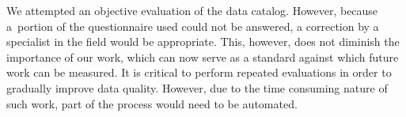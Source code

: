 We attempted an objective evaluation of the data catalog.
However, because a~portion of the questionnaire used could not be answered, a correction by a specialist in the field would be appropriate.
This, however, does not diminish the importance of our work, which can now serve as a standard against which future work can be measured.
It is critical to perform repeated evaluations in order to gradually improve data quality.
However, due to the time consuming nature of such work, part of the process would need to be automated.

